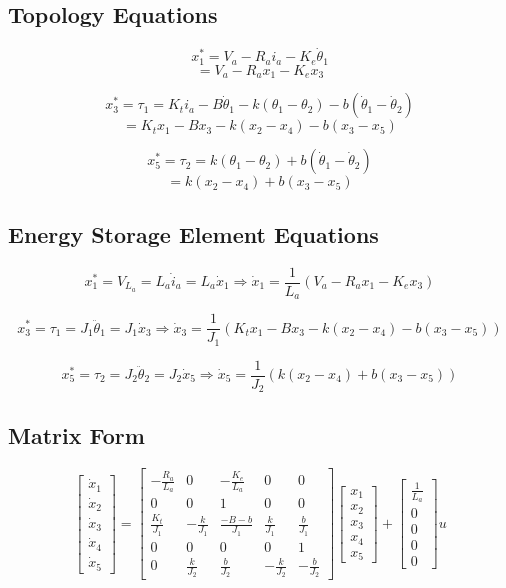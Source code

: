 \documentclass{article}
\begin{document}
\subsection{Topology Equations}
\[
x^*_1 = V_a - R_a i_a - K_e \dot{\theta}_1
\]
\[
= V_a - R_a x_1 - K_e x_3
\]

\[
x^*_3 = \tau_1 = K_t i_a - B \dot{\theta}_1 - k(\theta_1 - \theta_2) - b(\dot{\theta}_1 - \dot{\theta}_2)
\]
\[
= K_t x_1 - B x_3 - k(x_2 - x_4) - b(x_3 - x_5)
\]

\[
x^*_5 = \tau_2 = k(\theta_1 - \theta_2) + b(\dot{\theta}_1 - \dot{\theta}_2)
\]
\[
= k(x_2 - x_4) + b(x_3 - x_5)
\]

\subsection{Energy Storage Element Equations}
\[
x_1^* = V_{L_a} = L_a \dot{i}_a = L_a \dot{x}_1 \Rightarrow \dot{x}_1 = \frac{1}{L_a} (V_a - R_a x_1 - K_e x_3)
\]

\[
x_3^* = \tau_1 = J_1 \ddot{\theta}_1 = J_1 \dot{x}_3 \Rightarrow \dot{x}_3 = \frac{1}{J_1} \left( K_t x_1 - B x_3 - k(x_2 - x_4) - b(x_3 - x_5) \right)
\]

\[
x_5^* = \tau_2 = J_2 \ddot{\theta}_2 = J_2 \dot{x}_5 \Rightarrow \dot{x}_5 = \frac{1}{J_2} \left( k(x_2 - x_4) + b(x_3 - x_5) \right)
\]

\subsection{Matrix Form}
\[
\begin{bmatrix}
\dot{x}_1 \\
\dot{x}_2 \\
\dot{x}_3 \\
\dot{x}_4 \\
\dot{x}_5
\end{bmatrix}
=
\begin{bmatrix}
-\frac{R_a}{L_a} & 0 & -\frac{K_e}{L_a} & 0 & 0 \\
0 & 0 & 1 & 0 & 0 \\
\frac{K_t}{J_1} & -\frac{k}{J_1} & \frac{-B-b}{J_1} & \frac{k}{J_1} & \frac{b}{J_1} \\
0 & 0 & 0 & 0 & 1 \\
0 & \frac{k}{J_2} & \frac{b}{J_2} & -\frac{k}{J_2} & -\frac{b}{J_2}
\end{bmatrix}
\begin{bmatrix}
x_1 \\
x_2 \\
x_3 \\
x_4 \\
x_5
\end{bmatrix}
+
\begin{bmatrix}
\frac{1}{L_a} \\
0 \\
0 \\
0 \\
0
\end{bmatrix}
u
\]
\end{document}
